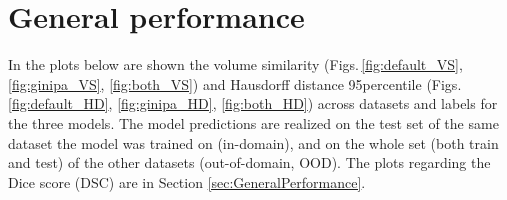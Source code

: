 \renewcommand\thefigure{A.\arabic{figure}}
\setcounter{figure}{0}
 \label{app:SupplementaryPlots}
\vspace{1cm}

\section{General performance}
In the plots below are shown the volume similarity (Figs.\,\ref{fig:default_VS}, \ref{fig:ginipa_VS}, \ref{fig:both_VS}) and Hausdorff distance 95\th percentile (Figs.\,\ref{fig:default_HD}, \ref{fig:ginipa_HD}, \ref{fig:both_HD}) across datasets and labels for the three models. The model predictions are realized on the test set of the same dataset the model was trained on (in-domain), and on the whole set (both train and test) of the other datasets (out-of-domain, OOD). The plots regarding the Dice score (DSC) are in Section \ref{sec:GeneralPerformance}.

